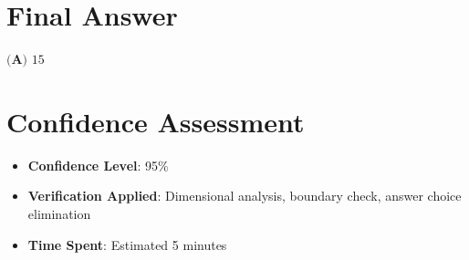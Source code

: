 \documentclass[12pt]{article}
\begin{document}
\section*{Final Answer}
$\boxed{\textbf{(A) } 15}$

\section*{Confidence Assessment}
\begin{itemize}[leftmargin=*]
    \item \textbf{Confidence Level}: 95\%
    \item \textbf{Verification Applied}: Dimensional analysis, boundary check, answer choice elimination
    \item \textbf{Time Spent}: Estimated 5 minutes
\end{itemize}
\end{document}
